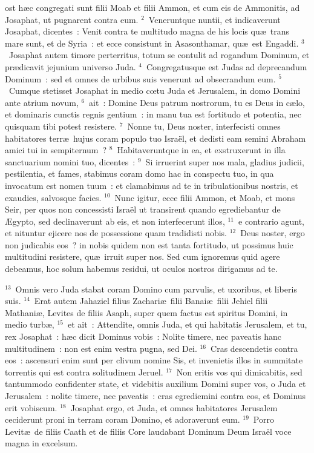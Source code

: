 \bchapter
{}ost h\ae c congregati sunt filii Moab et filii Ammon, et cum eis de Ammonitis, ad Josaphat, ut pugnarent contra eum.
${}^{2}$~Veneruntque nuntii, et indicaverunt Josaphat, dicentes~: Venit contra te multitudo magna de his locis qu\ae\ trans mare sunt, et de Syria~: et ecce consistunt in Asasonthamar, qu\ae\ est Engaddi.
${}^{3}$~Josaphat autem timore perterritus, totum se contulit ad rogandum Dominum, et pr\ae dicavit jejunium universo Juda.
${}^{4}$~Congregatusque est Judas ad deprecandum Dominum~: sed et omnes de urbibus suis venerunt ad obsecrandum eum.
${}^{5}$~Cumque stetisset Josaphat in medio cœtu Juda et Jerusalem, in domo Domini ante atrium novum,
${}^{6}$~ait~: Domine Deus patrum nostrorum, tu es Deus in c\ae lo, et dominaris cunctis regnis gentium~: in manu tua est fortitudo et potentia, nec quisquam tibi potest resistere.
${}^{7}$~Nonne tu, Deus noster, interfecisti omnes habitatores terr\ae\ hujus coram populo tuo Isra\"el, et dedisti eam semini Abraham amici tui in sempiternum~?
${}^{8}$~Habitaveruntque in ea, et exstruxerunt in illa sanctuarium nomini tuo, dicentes~:
${}^{9}$~Si irruerint super nos mala, gladius judicii, pestilentia, et fames, stabimus coram domo hac in conspectu tuo, in qua invocatum est nomen tuum~: et clamabimus ad te in tribulationibus nostris, et exaudies, salvosque facies.
${}^{10}$~Nunc igitur, ecce filii Ammon, et Moab, et mons Seir, per quos non concessisti Isra\"el ut transirent quando egrediebantur de \AE gypto, sed declinaverunt ab eis, et non interfecerunt illos,
${}^{11}$~e contrario agunt, et nituntur ejicere nos de possessione quam tradidisti nobis.
${}^{12}$~Deus noster, ergo non judicabis eos~? in nobis quidem non est tanta fortitudo, ut possimus huic multitudini resistere, qu\ae\ irruit super nos. Sed cum ignoremus quid agere debeamus, hoc solum habemus residui, ut oculos nostros dirigamus ad te.


${}^{13}$~Omnis vero Juda stabat coram Domino cum parvulis, et uxoribus, et liberis suis.
${}^{14}$~Erat autem Jahaziel filius Zachari\ae\ filii Banai\ae\ filii Jehiel filii Mathani\ae , Levites de filiis Asaph, super quem factus est spiritus Domini, in medio turb\ae ,
${}^{15}$~et ait~: Attendite, omnis Juda, et qui habitatis Jerusalem, et tu, rex Josaphat~: h\ae c dicit Dominus vobis~: Nolite timere, nec paveatis hanc multitudinem~: non est enim vestra pugna, sed Dei.
${}^{16}$~Cras descendetis contra eos~: ascensuri enim sunt per clivum nomine Sis, et invenietis illos in summitate torrentis qui est contra solitudinem Jeruel.
${}^{17}$~Non eritis vos qui dimicabitis, sed tantummodo confidenter state, et videbitis auxilium Domini super vos, o Juda et Jerusalem~: nolite timere, nec paveatis~: cras egrediemini contra eos, et Dominus erit vobiscum.
${}^{18}$~Josaphat ergo, et Juda, et omnes habitatores Jerusalem ceciderunt proni in terram coram Domino, et adoraverunt eum.
${}^{19}$~Porro Levit\ae\ de filiis Caath et de filiis Core laudabant Dominum Deum Isra\"el voce magna in excelsum.


